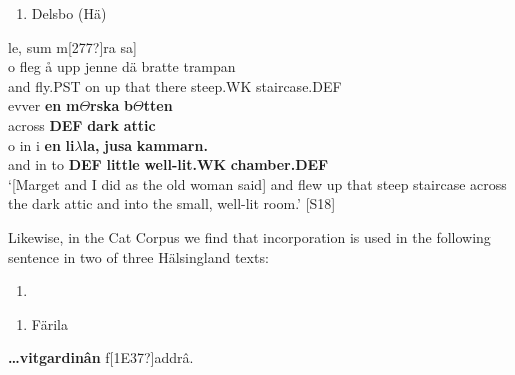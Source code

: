 \begin{enumerate} %
\item 
Delsbo (Hä)

\end{enumerate} %
\ea\label{}
\gll [Marget o j$\Theta $ j[277?]le, sum m[277?]ra sa]\\


\ea\label{}
\gll o  fleg  å  upp  jenne  dä  bratte  trampan\\


and  fly.PST  on  up  that  there  steep.WK  staircase.DEF\\ %


\ea\label{}
\gll evver  \textbf{en} \textbf{m}\textbf{$\Theta $}\textbf{rska} \textbf{b}\textbf{$\Theta $}\textbf{tten}\\


across  \textbf{DEF} \textbf{dark} \textbf{attic}\\ %


\ea\label{}
\gll o  in  i  \textbf{en}\textbf{  li}\textbf{$\lambda $}\textbf{la,}\textbf{  jusa}\textbf{  kammarn.}\\


and  in  to   \textbf{DEF} \textbf{little} \textbf{well-lit.WK} \textbf{chamber.DEF}\\ %


‘[Marget and I did as the old woman said] and flew up that steep staircase across the dark attic and into the small, well-lit room.’ [S18]
\z

Likewise, in the Cat Corpus we find that incorporation is used in the following sentence in two of three Hälsingland texts:

\begin{enumerate} %
\item 
\end{enumerate} %
\begin{enumerate} %
\item 
Färila

\end{enumerate} %
\ea\label{}
\gll \textbf{…vitgardinân} f[1E37?]addrâ.\\


